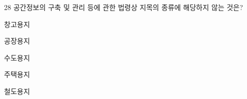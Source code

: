 \begin{question}{28}
공간정보의 구축 및 관리 등에 관한 법령상 지목의 종류에 해당하지 않는 것은?
\begin{choices}
  \item 창고용지
  \item 공장용지
  \item 수도용지
  \item 주택용지
  \item 철도용지
\end{choices}
\end{question}
